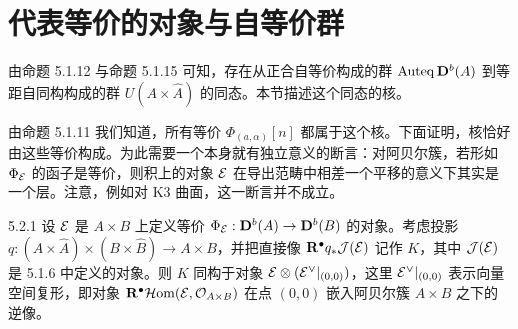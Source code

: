 
\section{代表等价的对象与自等价群}


由命题 5.1.12 与命题 5.1.15 可知，存在从正合自等价构成的群 $\operatorname{Auteq}\mathbf{D}^{b}(A)$ 到等距自同构构成的群 $U(A\times\hat A)$ 的同态。本节描述这个同态的核。

由命题 5.1.11 我们知道，所有等价 $\Phi_{(a,\alpha)}[n]$ 都属于这个核。下面证明，核恰好由这些等价构成。为此需要一个本身就有独立意义的断言：对阿贝尔簇，若形如 $\Phi_{\mathcal{E}}$ 的函子是等价，则积上的对象 $\mathcal{E}$ 在导出范畴中相差一个平移的意义下其实是一个层。注意，例如对 K3 曲面，这一断言并不成立。

\begin{lemma}{5.2.1}
设 $\mathcal{E}$ 是 $A\times B$ 上定义等价 $\Phi_{\mathcal{E}}:\mathbf{D}^{b}(A)\to\mathbf{D}^{b}(B)$ 的对象。考虑投影 $q:(A\times\hat A)\times(B\times\hat B)\to A\times B$，并把直接像 $\mathbf{R}^{\bullet} q_*\mathcal{J}(\mathcal{E})$ 记作 $K$，其中 $\mathcal{J}(\mathcal{E})$ 是 5.1.6 中定义的对象。则 $K$ 同构于对象 $\mathcal{E}\otimes(\mathcal{E}^\vee|_{(0,0)})$，这里 $\mathcal{E}^\vee|_{(0,0)}$ 表示向量空间复形，即对象 $\mathbf{R}^{\bullet}\mathcal{H}\mathrm{om}(\mathcal{E},\mathcal{O}_{A\times B})$ 在点 $(0,0)$ 嵌入阿贝尔簇 $A\times B$ 之下的逆像。
\end{lemma}


